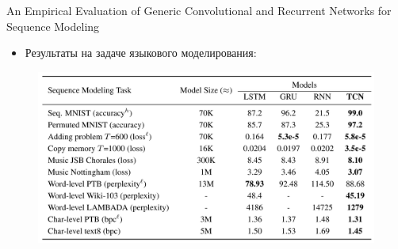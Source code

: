 \begin{frame}[c]{An Empirical Evaluation of Generic Convolutional and Recurrent Networks for Sequence Modeling}
\begin{itemize}
	[square]
	\item Результаты на задаче языкового моделирования:
\end{itemize}
\begin{figure}
	\centering
	\includegraphics[width=1.0\textwidth]{figures/tcnres.png}
\end{figure}
\end{frame}